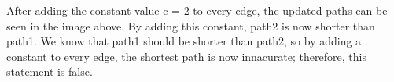 \documentclass[11pt]{article}
\begin{document}
\begin{center}
\end{center}
After adding the constant value c = 2 to every edge, the updated paths can be seen in the image above. By adding this constant, path2 is now shorter than path1. We know that path1 should be shorter than path2, so by adding a constant to every edge, the shortest path is now innacurate; therefore, this statement is false.
\end{document}

